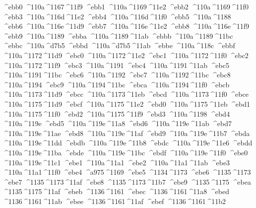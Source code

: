 \checkit ^^^^ebb0 ^^^^110a^^^^1167^^^^11f9
\checkit ^^^^ebb1 ^^^^110a^^^^1169^^^^11e2
\checkit ^^^^ebb2 ^^^^110a^^^^1169^^^^11f0
\checkit ^^^^ebb3 ^^^^110a^^^^116d^^^^11e2
\checkit ^^^^ebb4 ^^^^110a^^^^116d^^^^11f0
\checkit ^^^^ebb5 ^^^^110a^^^^1188
\checkit ^^^^ebb6 ^^^^110a^^^^116e^^^^11d9
\checkit ^^^^ebb7 ^^^^110a^^^^116e^^^^11e2
\checkit ^^^^ebb8 ^^^^110a^^^^116e^^^^11f9
\checkit ^^^^ebb9 ^^^^110a^^^^1189
\checkit ^^^^ebba ^^^^110a^^^^1189^^^^11ab
\checkit ^^^^ebbb ^^^^110a^^^^1189^^^^11bc
\checkit ^^^^ebbc ^^^^110a^^^^d7b5
\checkit ^^^^ebbd ^^^^110a^^^^d7b5^^^^11ab
\checkit ^^^^ebbe ^^^^110a^^^^118c
\checkit ^^^^ebbf ^^^^110a^^^^1172^^^^11d9
\checkit ^^^^ebc0 ^^^^110a^^^^1172^^^^11e2
\checkit ^^^^ebc1 ^^^^110a^^^^1172^^^^11f0
\checkit ^^^^ebc2 ^^^^110a^^^^1172^^^^11f9
\checkit ^^^^ebc3 ^^^^110a^^^^1191
\checkit ^^^^ebc4 ^^^^110a^^^^1191^^^^11ab
\checkit ^^^^ebc5 ^^^^110a^^^^1191^^^^11bc
\checkit ^^^^ebc6 ^^^^110a^^^^1192
\checkit ^^^^ebc7 ^^^^110a^^^^1192^^^^11bc
\checkit ^^^^ebc8 ^^^^110a^^^^1194
\checkit ^^^^ebc9 ^^^^110a^^^^1194^^^^11bc
\checkit ^^^^ebca ^^^^110a^^^^1194^^^^11f0
\checkit ^^^^ebcb ^^^^110a^^^^1173^^^^11d9
\checkit ^^^^ebcc ^^^^110a^^^^1173^^^^11eb
\checkit ^^^^ebcd ^^^^110a^^^^1173^^^^11f0
\checkit ^^^^ebce ^^^^110a^^^^1175^^^^11d9
\checkit ^^^^ebcf ^^^^110a^^^^1175^^^^11e2
\checkit ^^^^ebd0 ^^^^110a^^^^1175^^^^11eb
\checkit ^^^^ebd1 ^^^^110a^^^^1175^^^^11f0
\checkit ^^^^ebd2 ^^^^110a^^^^1175^^^^11f9
\checkit ^^^^ebd3 ^^^^110a^^^^1198
\checkit ^^^^ebd4 ^^^^110a^^^^119e
\checkit ^^^^ebd5 ^^^^110a^^^^119e^^^^11a8
\checkit ^^^^ebd6 ^^^^110a^^^^119e^^^^11ab
\checkit ^^^^ebd7 ^^^^110a^^^^119e^^^^11ae
\checkit ^^^^ebd8 ^^^^110a^^^^119e^^^^11af
\checkit ^^^^ebd9 ^^^^110a^^^^119e^^^^11b7
\checkit ^^^^ebda ^^^^110a^^^^119e^^^^11dd
\checkit ^^^^ebdb ^^^^110a^^^^119e^^^^11b8
\checkit ^^^^ebdc ^^^^110a^^^^119e^^^^11e6
\checkit ^^^^ebdd ^^^^110a^^^^119e^^^^11ba
\checkit ^^^^ebde ^^^^110a^^^^119e^^^^11bc
\checkit ^^^^ebdf ^^^^110a^^^^119e^^^^11f0
\checkit ^^^^ebe0 ^^^^110a^^^^119e^^^^11c1
\checkit ^^^^ebe1 ^^^^110a^^^^11a1
\checkit ^^^^ebe2 ^^^^110a^^^^11a1^^^^11ab
\checkit ^^^^ebe3 ^^^^110a^^^^11a1^^^^11f0
\checkit ^^^^ebe4 ^^^^a975^^^^1169
\checkit ^^^^ebe5 ^^^^1134^^^^1173
\checkit ^^^^ebe6 ^^^^1135^^^^1173
\checkit ^^^^ebe7 ^^^^1135^^^^1173^^^^11af
\checkit ^^^^ebe8 ^^^^1135^^^^1173^^^^11b7
\checkit ^^^^ebe9 ^^^^1135^^^^1175
\checkit ^^^^ebea ^^^^1135^^^^1175^^^^11af
\checkit ^^^^ebeb ^^^^1136^^^^1161
\checkit ^^^^ebec ^^^^1136^^^^1161^^^^11a8
\checkit ^^^^ebed ^^^^1136^^^^1161^^^^11ab
\checkit ^^^^ebee ^^^^1136^^^^1161^^^^11af
\checkit ^^^^ebef ^^^^1136^^^^1161^^^^11b2

